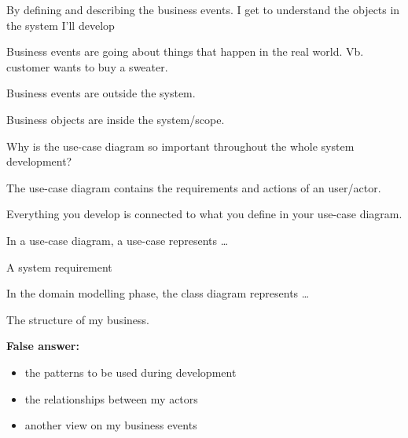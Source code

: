 \begin{question}
By defining and describing the business events. I get to understand the objects in the system I’ll develop
\end{question}

\begin{solution}[print]
Business events are going about things that happen in the real world. Vb. customer wants to buy a sweater.

Business events are outside the system.

Business objects are inside the system/scope.
\end{solution}



\begin{question}
Why is the use-case diagram so important throughout the whole system development?
\end{question}

\begin{solution}[print]
The use-case diagram contains the requirements and actions of an user/actor.

Everything you develop is connected to what you define in your use-case diagram.
\end{solution}



\begin{question}
In a use-case diagram, a use-case represents …
\end{question}

\begin{solution}[print]
A system requirement
\end{solution}



\begin{question}
In the domain modelling phase, the class diagram represents …
\end{question}

\begin{solution}[print]
The structure of my business.

\textbf{False answer:}
\begin{itemize}
    \item the patterns to be used during development
    \item the relationships between my actors
    \item another view on my business events
\end{itemize}

\end{solution}



